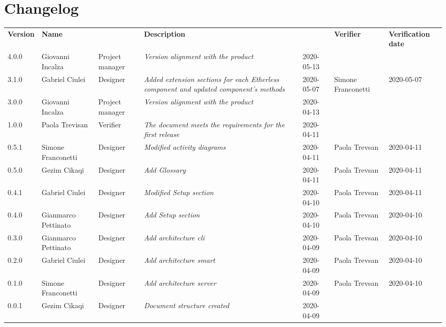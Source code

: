 \section*{Changelog}
\renewcommand{\arraystretch}{1.8}
  \setlength\LTleft{-1.7cm}
  \begin{longtable}{|p{1.7cm}|p{2cm}|p{2.5cm}|p{3cm}|p{1.7cm}|p{2cm}|p{2.3cm}|}
    \hline
    \rowcolor{header}
    \textbf{Version} & \textbf{Name} & \centering{\textbf{Role}} & \textbf{Description} &      \centering{\textbf{Date}} & \textbf{Verifier} & \textbf{Verification date} \\
	4.0.0 & Giovanni Incalza & Project manager & \small{\textit{Version alignment with the product}} & 2020-05-13 &  & \\
 	3.1.0 & Gabriel Ciulei & Designer & \small{\textit{Added extension sections for each Etherless component and updated component's methods}} & 2020-05-07 & Simone Franconetti & 2020-05-07\\
    3.0.0 & Giovanni Incalza & Project manager & \small{\textit{Version alignment with the product}} & 2020-04-13 &  & \\

    1.0.0 & Paola Trevisan & Verifier & \small{\textit{The document meets the requirements for the first release}} & 2020-04-11 &  & \\
    0.5.1 & Simone Franconetti & Designer & \small{\textit{Modified activity diagrams}} & 2020-04-11 & Paola Trevsan & 2020-04-11\\
    0.5.0 & Gezim Cikaqi & Designer & \small{\textit{Add Glossary}} & 2020-04-11 &Paola Trevsan  & 2020-04-11\\
    0.4.1 & Gabriel Ciulei & Designer & \small{\textit{Modified Setup section}} & 2020-04-10 &Paola Trevsan  & 2020-04-11\\
    0.4.0 & Gianmarco Pettinato & Designer & \small{\textit{Add Setup section}} & 2020-04-10 & Paola Trevsan & 2020-04-10\\
    0.3.0 & Gianmarco Pettinato & Designer & \small{\textit{Add architecture cli}} & 2020-04-09 &Paola Trevsan  & 2020-04-10\\
    0.2.0 & Gabriel Ciulei & Designer & \small{\textit{Add architecture smart}} & 2020-04-09 & Paola Trevsan & 2020-04-10\\
    0.1.0 & Simone Franconetti & Designer & \small{\textit{Add architecture server}} & 2020-04-09 & Paola Trevsan & 2020-04-10\\
    0.0.1 & Gezim Cikaqi & Designer & \small{\textit{Document structure created}} & 2020-04-09 &  & \\

    \hline
  \end{longtable}
\setlength\LTleft{0cm}
\restoregeometry
